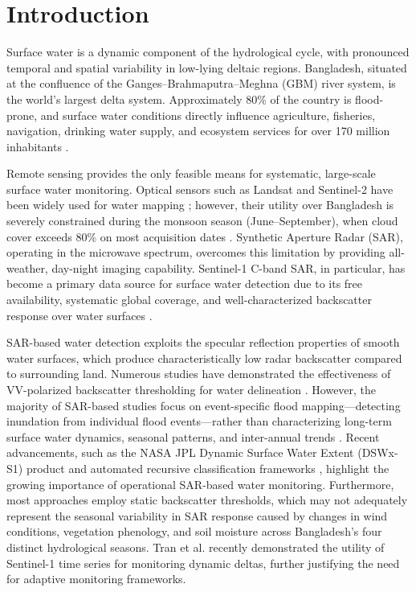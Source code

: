 \documentclass[fleqn,10pt,twocolumn]{article}
\begin{document}
\section{Introduction}

Surface water is a dynamic component of the hydrological cycle, with pronounced temporal and spatial variability in low-lying deltaic regions. Bangladesh, situated at the confluence of the Ganges--Brahmaputra--Meghna (GBM) river system, is the world's largest delta system. Approximately 80\% of the country is flood-prone, and surface water conditions directly influence agriculture, fisheries, navigation, drinking water supply, and ecosystem services for over 170 million inhabitants \cite{brammer2014, akter2016, gourdji2015}.

Remote sensing provides the only feasible means for systematic, large-scale surface water monitoring. Optical sensors such as Landsat and Sentinel-2 have been widely used for water mapping \cite{pekel2016, pickens2020}; however, their utility over Bangladesh is severely constrained during the monsoon season (June--September), when cloud cover exceeds 80\% on most acquisition dates \cite{uddin2019, hassan2021}. Synthetic Aperture Radar (SAR), operating in the microwave spectrum, overcomes this limitation by providing all-weather, day-night imaging capability. Sentinel-1 C-band SAR, in particular, has become a primary data source for surface water detection due to its free availability, systematic global coverage, and well-characterized backscatter response over water surfaces \cite{torres2012, twele2016, haghighi2022}.

SAR-based water detection exploits the specular reflection properties of smooth water surfaces, which produce characteristically low radar backscatter compared to surrounding land. Numerous studies have demonstrated the effectiveness of VV-polarized backscatter thresholding for water delineation \cite{twele2016, bioresita2018, martinis2009}. However, the majority of SAR-based studies focus on event-specific flood mapping---detecting inundation from individual flood events---rather than characterizing long-term surface water dynamics, seasonal patterns, and inter-annual trends \cite{devries2020}. Recent advancements, such as the NASA JPL Dynamic Surface Water Extent (DSWx-S1) product \cite{nasa2024} and automated recursive classification frameworks \cite{markert2020, ogrady2021}, highlight the growing importance of operational SAR-based water monitoring. Furthermore, most approaches employ static backscatter thresholds, which may not adequately represent the seasonal variability in SAR response caused by changes in wind conditions, vegetation phenology, and soil moisture across Bangladesh's four distinct hydrological seasons. Tran et al. \cite{tran2024} recently demonstrated the utility of Sentinel-1 time series for monitoring dynamic deltas, further justifying the need for adaptive monitoring frameworks.
\end{document}
